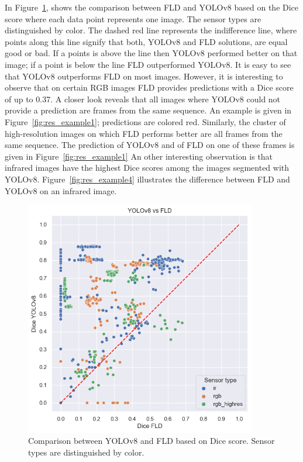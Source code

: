 \documentclass[Master,MDS,english]{BASE/twbook} %
\begin{document}
In Figure~\ref{fig:yolo_vs_fld}, shows the comparison between FLD and YOLOv8 based on the Dice score where each data point represents one image. The sensor types are distinguished by color. The dashed red line represents the indifference line, where points along this line signify that both, YOLOv8 and FLD solutions, are equal good or bad. If a points is above the line then YOLOv8 performed better on that image; if a point is below the line FLD outperformed YOLOv8. It is easy to see that YOLOv8 outperforms FLD on most images. However, it is interesting to observe that on certain RGB images FLD provides predictions with a Dice score of up to 0.37. A closer look reveals that all images where YOLOv8 could not provide a prediction are frames from the same sequence. An example is given in Figure~\ref{fig:res_example1}; predictions are colored red. Similarly, the cluster of high-resolution images on which FLD performs better are all frames from the same sequence. The prediction of YOLOv8 and of FLD on one of these frames is given in Figure~\ref{fig:res_example1}
An other interesting observation is that infrared images have the highest Dice scores among the images segmented with YOLOv8. Figure~\ref{fig:res_example4} illustrates the difference between FLD and YOLOv8 on an infrared image.



\begin{figure}[h]
\centering
\includegraphics[width=0.9\textwidth]{images/results/dice_fld_vs_yolo}
\caption{Comparison between YOLOv8 and FLD based on Dice score. Sensor types are distinguished by color. }
\label{fig:yolo_vs_fld}
\end{figure}
\end{document}
